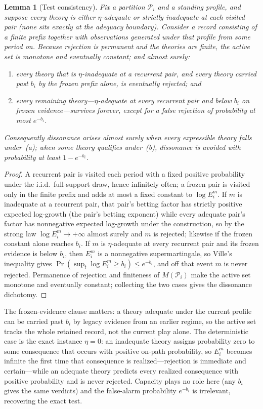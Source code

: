 \documentclass[11pt]{article}
\newtheorem{lemma}[assumption]{Lemma}
\theoremstyle{definition}
\begin{document}
\begin{lemma}[Test consistency]
\label{lem:test-consistency}
Fix a partition $\mathcal P_i$ and a standing profile, and suppose every theory is either $\eta$-adequate or strictly inadequate at each visited pair (none sits exactly at the adequacy boundary).
Consider a record consisting of a finite prefix together with observations generated under that profile from some period on.
Because rejection is permanent and the theories are finite, the active set is monotone and eventually constant; and almost surely:
\begin{enumerate}[label=(\alph*)]
  \item every theory that is $\eta$-inadequate at a recurrent pair, and every theory carried past $b_i$ by the frozen prefix alone, is eventually rejected; and
  \item every remaining theory---$\eta$-adequate at every recurrent pair and below $b_i$ on frozen evidence---survives forever, except for a false rejection of probability at most $e^{-b_i}$.
\end{enumerate}
Consequently dissonance arises almost surely when every expressible theory falls under~(a); when some theory qualifies under~(b), dissonance is avoided with probability at least $1-e^{-b_i}$.
\end{lemma}

\begin{proof}
A recurrent pair is visited each period with a fixed positive probability under the i.i.d.\ full-support draw, hence infinitely often; a frozen pair is visited only in the finite prefix and adds at most a fixed constant to $\log E_i^{m}$.
If $m$ is inadequate at a recurrent pair, that pair's betting factor has strictly positive expected log-growth (the pair's betting exponent) while every adequate pair's factor has nonnegative expected log-growth under the construction, so by the strong law $\log E_i^{m}\to+\infty$ almost surely and $m$ is rejected; likewise if the frozen constant alone reaches $b_i$.
If $m$ is $\eta$-adequate at every recurrent pair and its frozen evidence is below $b_i$, then $E_i^{m}$ is a nonnegative supermartingale, so Ville's inequality gives $\Pr(\sup_t\log E_i^{m}\ge b_i)\le e^{-b_i}$, and off that event $m$ is never rejected.
Permanence of rejection and finiteness of $M(\mathcal P_i)$ make the active set monotone and eventually constant; collecting the two cases gives the dissonance dichotomy.
\end{proof}

The frozen-evidence clause matters: a theory adequate under the current profile can be carried past $b_i$ by legacy evidence from an earlier regime, so the active set tracks the whole retained record, not the current play alone.
The deterministic case is the exact instance $\eta=0$: an inadequate theory assigns probability zero to some consequence that occurs with positive on-path probability, so $E_i^{m}$ becomes infinite the first time that consequence is realized---rejection is immediate and certain---while an adequate theory predicts every realized consequence with positive probability and is never rejected.
Capacity plays no role here (any $b_i$ gives the same verdicts) and the false-alarm probability $e^{-b_i}$ is irrelevant, recovering the exact test.
\end{document}
